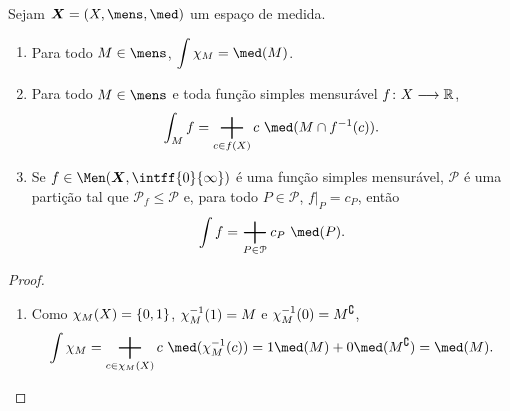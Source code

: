 \begin{prop}
Sejam $\bm X = (X,\mens,\med)$ um espaço de medida.
	\begin{enumerate}
	\item Para todo $M \in \mens$, $\displaystyle\int \idc_M = \med(M)$.
	\item Para todo $M \in \mens$ e toda função simples mensurável $f\colon X \longrightarrow \mathbb{R}$,
		\begin{equation*}
		\int_M f = \sum_{c \in f(X)} c \ \med(M \cap f\inv(c)).
		\end{equation*}
	
	\item Se $f \in \Men(\bm X,\intff{0}{\infty})$ é uma função simples mensurável, $\mathcal P$ é uma partição tal que $\mathcal P_f \leq \mathcal P$ e, para todo $P \in \mathcal P$, $f|_{P} = c_P$, então
		\begin{equation*}
		\int f = \sum_{P \in \mathcal P} c_P \ \med(P).
		\end{equation*}
	\end{enumerate}
\end{prop}
\begin{proof}
	\begin{enumerate}
	\item Como $\chi_M(X) = \{0,1\}$, $\chi_M^{-1}(1) = M$ e $\chi_M^{-1}(0) = M^\complement$,
		\begin{equation*}
		\int \idc_M = \sum_{c \in \idc_M(X)} c \ \med(\idc_M\inv(c)) = 1 \med(M)+0\med(M^\complement) = \med(M).
		\end{equation*}
	\end{enumerate}
\end{proof}

